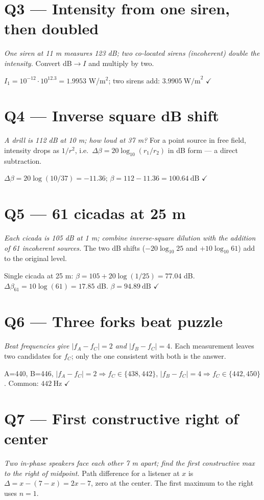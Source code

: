 \documentclass[11pt]{article}
\newcommand{\checkmk}{\ensuremath{\checkmark}}
\begin{document}
\section*{Q3 --- Intensity from one siren, then doubled}
\emph{One siren at 11 m measures 123 dB; two co-located sirens (incoherent) double the intensity.} Convert dB$\to I$ and multiply by two.

$I_1 = 10^{-12}\cdot 10^{12.3} = 1.9953$ W/m$^2$; two sirens add: $\boxed{3.9905\ \text{W/m}^2}$ \checkmk

\section*{Q4 --- Inverse square dB shift}
\emph{A drill is 112 dB at 10 m; how loud at 37 m?} For a point source in free field, intensity drops as $1/r^2$, i.e.\ $\Delta\beta = 20\log_{10}(r_1/r_2)$ in dB form --- a direct subtraction.

$\Delta\beta = 20\log(10/37) = -11.36$; $\beta = 112 - 11.36 = \boxed{100.64\ \text{dB}}$ \checkmk

\section*{Q5 --- 61 cicadas at 25 m}
\emph{Each cicada is 105 dB at 1 m; combine inverse-square dilution with the addition of 61 incoherent sources.} The two dB shifts ($-20\log_{10}25$ and $+10\log_{10}61$) add to the original level.

Single cicada at 25 m: $\beta = 105 + 20\log(1/25) = 77.04$ dB. $\Delta\beta_{61} = 10\log(61) = 17.85$ dB.
$\beta = \boxed{94.89\ \text{dB}}$ \checkmk

\section*{Q6 --- Three forks beat puzzle}
\emph{Beat frequencies give $|f_A-f_C|=2$ and $|f_B-f_C|=4$.} Each measurement leaves two candidates for $f_C$; only the one consistent with both is the answer.

A=440, B=446, $|f_A-f_C|=2 \Rightarrow f_C\in\{438,442\}$, $|f_B-f_C|=4 \Rightarrow f_C\in\{442,450\}$. Common: $\boxed{442\ \text{Hz}}$ \checkmk

\section*{Q7 --- First constructive right of center}
\emph{Two in-phase speakers face each other 7 m apart; find the first constructive max to the right of midpoint.} Path difference for a listener at $x$ is $\Delta = x-(7-x)=2x-7$, zero at the center. The first maximum to the right uses $n=1$.
\end{document}
